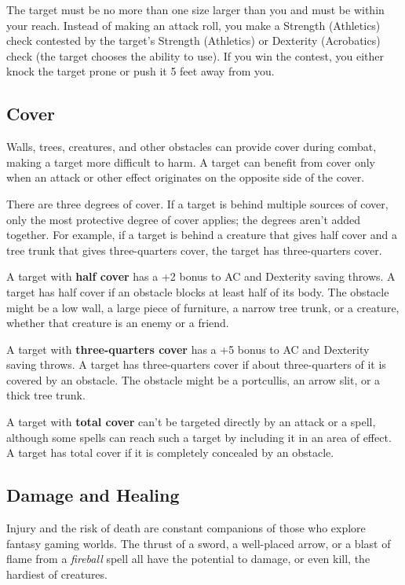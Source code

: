 \documentclass[
]{article}
\begin{document}
The target must be no more than one size larger than you and must be
within your reach. Instead of making an attack roll, you make a Strength
(Athletics) check contested by the target's Strength (Athletics) or
Dexterity (Acrobatics) check (the target chooses the ability to use). If
you win the contest, you either knock the target prone or push it 5 feet
away from you.

\hypertarget{cover}{%
\subsection{Cover}\label{cover}}

Walls, trees, creatures, and other obstacles can provide cover during
combat, making a target more difficult to harm. A target can benefit
from cover only when an attack or other effect originates on the
opposite side of the cover.

There are three degrees of cover. If a target is behind multiple sources
of cover, only the most protective degree of cover applies; the degrees
aren't added together. For example, if a target is behind a creature
that gives half cover and a tree trunk that gives three-quarters cover,
the target has three-quarters cover.

A target with \textbf{half cover} has a +2 bonus to AC and Dexterity
saving throws. A target has half cover if an obstacle blocks at least
half of its body. The obstacle might be a low wall, a large piece of
furniture, a narrow tree trunk, or a creature, whether that creature is
an enemy or a friend.

A target with \textbf{three-quarters cover} has a +5 bonus to AC and
Dexterity saving throws. A target has three-quarters cover if about
three-quarters of it is covered by an obstacle. The obstacle might be a
portcullis, an arrow slit, or a thick tree trunk.

A target with \textbf{total cover} can't be targeted directly by an
attack or a spell, although some spells can reach such a target by
including it in an area of effect. A target has total cover if it is
completely concealed by an obstacle.

\hypertarget{damage-and-healing}{%
\subsection{Damage and Healing}\label{damage-and-healing}}

Injury and the risk of death are constant companions of those who
explore fantasy gaming worlds. The thrust of a sword, a well-placed
arrow, or a blast of flame from a \emph{fireball} spell all have the
potential to damage, or even kill, the hardiest of creatures.
\end{document}
